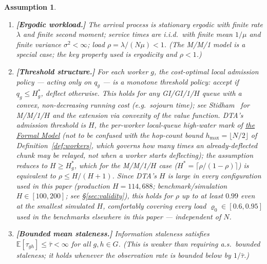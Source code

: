 \documentclass[11pt,a4paper]{article}
\newtheorem{assumption}{Assumption}[section]
\begin{document}
\begin{assumption}\label{ass:mmp}
\begin{enumerate}[label=(\textup{A\arabic*})]
  \item\label{ass:ergodic}
        \textbf{[Ergodic workload.]}
        The arrival process is stationary ergodic with finite rate
        $\lambda$ and finite second moment; service times are i.i.d.\
        with finite mean $1/\mu$ and finite variance $\sigma^2 < \infty$;
        load $\rho = \lambda/(N\mu) < 1$.  (The M/M/1 model is a special
        case; the key property used is ergodicity and $\rho < 1$.)

  \item\label{ass:threshold}
        \textbf{[Threshold structure.]}
        For each worker $g$, the cost-optimal local admission policy
        --- acting only on $q_g$ --- is a monotone threshold policy:
        accept if $q_g \leq H_g^*$, deflect otherwise.
        This holds for \emph{any} GI/GI/1/$H$ queue with a convex,
        non-decreasing running cost (e.g.\ sojourn time); see
        Stidham~\cite{stidham1985} for M/M/1/$H$ and the extension via
        convexity of the value function.
        DTA's admission threshold is $H$, the per-worker local-queue
        high-water mark of \hyperref[chap:formal_model]{the Formal Model}
        (\emph{not} to be confused with the hop-count bound $h_{\max} =
        \lfloor N/2\rfloor$ of Definition~\ref{def:workers}, which
        governs how many times an already-deflected chunk may be
        relayed, not when a worker starts deflecting); the assumption
        reduces to $H \geq
        H_g^*$, which for the M/M/1/$H$ case ($H^* =
        \lceil\rho/(1-\rho)\rceil$) is equivalent to $\rho \leq H/(H+1)$.
        Since DTA's $H$ is large in every configuration used in this
        paper (production $H = 114{,}688$; benchmark/simulation
        $H \in [100, 200]$; see \S\ref{sec:validity}), this holds for
        $\rho$ up to at least $0.99$ even at the smallest simulated $H$,
        comfortably covering every load $\varrho_0 \in [0.6, 0.95]$ used
        in the benchmarks elsewhere in this paper --- independent of
        $N$.

  \item\label{ass:bounded_tau}
        \textbf{[Bounded mean staleness.]}
        Information staleness satisfies
        $\mathbb{E}[\tau_{gh}] \leq \bar\tau < \infty$ for all $g,h \in G$.
        (This is weaker than requiring a.s.\ bounded staleness;
        it holds whenever the observation rate is bounded below by
        $1/\bar\tau$.)
\end{enumerate}
\end{assumption}
\end{document}
